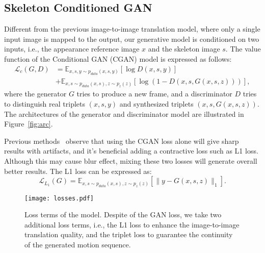 \documentclass[journal]{IEEEtran}
\begin{document}
\subsection{Skeleton Conditioned GAN}
Different from the previous image-to-image translation model, where only a single input image is mapped to the output, our generative model is conditioned on two inputs, i.e., the appearance reference image $x$ and the skeleton image $s$.
The value function of the Conditional GAN (CGAN) model is expressed as follows:
\begin{equation}
\begin{split}
\mathcal{L}_{c}(G,D)&=\mathbb{E}_{x,s,y\sim p_{data}(x,s,y)}[\log D(x,s,y)]\\
&+\mathbb{E}_{x,s\sim p_{data}(x,s),z\sim p_{z}(z)}[\log(1-D(x,s,G(x,s,z)))],
\end{split}
\label{func:sub}
\end{equation}
where the generator $G$ tries to produce a new frame, and a discriminator $D$ tries to distinguish real triplets $(x,s,y)$ and synthesized triplets $(x,s,G(x,s,z))$.
The architectures of the generator and discriminator model are illustrated in Figure~\ref{fig:arc}.

Previous methods~\cite{DBLP:journals/corr/IsolaZZE16,DBLP:journals/corr/MathieuCL15} observe that using the CGAN loss alone will give sharp results with artifacts, and it's beneficial adding a contractive loss such as L1 loss. Although this may cause blur effect, mixing these two losses will generate overall better results. The L1 loss can be expressed as:
\begin{equation}
\mathcal{L}_{L_1}(G)=\mathbb{E}_{x,s\sim p_{data}(x,s),z\sim p_{z}(z)}[\|y-G(x,s,z)\|_1].
\end{equation}


\begin{figure}[t]
\center
\texttt{[image: losses.pdf]}
\caption{Loss terms of the model. Despite of the GAN loss, we take two additional loss terms, i.e., the L1 loss to enhance the image-to-image translation quality, and the triplet loss to guarantee the continuity of the generated motion sequence.}
\label{fig:losses}
\end{figure}
\end{document}
